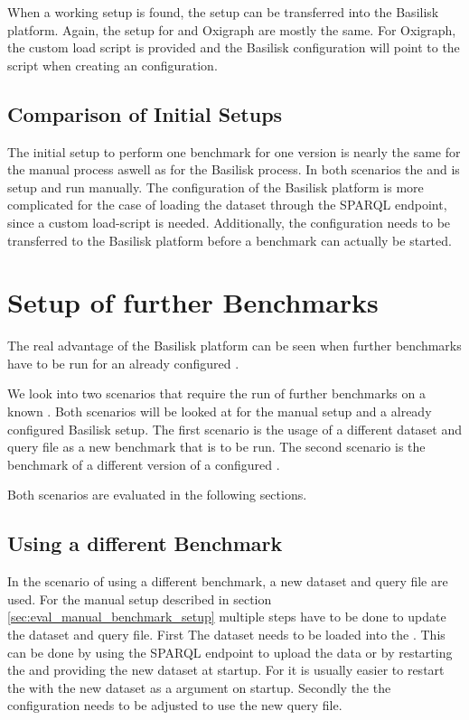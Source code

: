 When a working setup is found, the setup can be transferred into the Basilisk platform.
Again, the setup for \tentris{} and Oxigraph are mostly the same.
For Oxigraph, the custom load script is provided and the Basilisk configuration will point to the script when creating an \iguana{} configuration.



\subsection{Comparison of Initial Setups}
The initial setup to perform one benchmark for one \ts{} version is nearly the same for the manual process aswell as for the Basilisk process.
In both scenarios the \ts{} and \iguana{} is setup and run manually.
The configuration of the Basilisk platform is more complicated for the case of loading the dataset through the SPARQL endpoint, since a custom load-script is needed.
Additionally, the configuration needs to be transferred to the Basilisk platform before a benchmark can actually be started.


\section{Setup of further Benchmarks}
The real advantage of the Basilisk platform can be seen when further benchmarks have to be run for an already configured \ts{}.

We look into two scenarios that require the run of further benchmarks on a known \ts{}.
Both scenarios will be looked at for the manual setup and a already configured Basilisk setup.
The first scenario is the usage of a different dataset and query file as a new benchmark that is to be run.
The second scenario is the benchmark of a different version of a configured \ts{}.

Both scenarios are evaluated in the following sections.


\subsection{Using a different Benchmark}
In the scenario of using a different benchmark, a new dataset and query file are used.
For the manual setup described in section \ref{sec:eval_manual_benchmark_setup} multiple steps have to be done to update the dataset and query file.
First The dataset needs to be loaded into the \ts{}.
This can be done by using the SPARQL endpoint to upload the data or by restarting the \ts{} and providing the new dataset at startup.
For \tentris{} it is usually easier to restart the \ts{} with the new dataset as a argument on startup.
Secondly the the \iguana{} configuration needs to be adjusted to use the new query file.
\\

